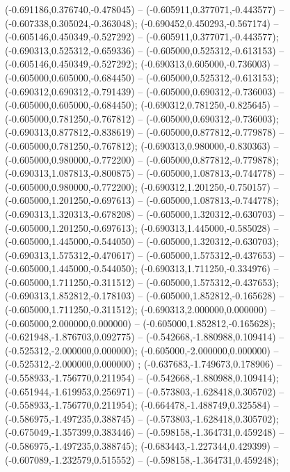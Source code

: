 (-0.691186,0.376740,-0.478045) -- (-0.605911,0.377071,-0.443577) -- (-0.607338,0.305024,-0.363048);
 (-0.690452,0.450293,-0.567174) -- (-0.605146,0.450349,-0.527292) -- (-0.605911,0.377071,-0.443577);
 (-0.690313,0.525312,-0.659336) -- (-0.605000,0.525312,-0.613153) -- (-0.605146,0.450349,-0.527292);
 (-0.690313,0.605000,-0.736003) -- (-0.605000,0.605000,-0.684450) -- (-0.605000,0.525312,-0.613153);
 (-0.690312,0.690312,-0.791439) -- (-0.605000,0.690312,-0.736003) -- (-0.605000,0.605000,-0.684450);
 (-0.690312,0.781250,-0.825645) -- (-0.605000,0.781250,-0.767812) -- (-0.605000,0.690312,-0.736003);
 (-0.690313,0.877812,-0.838619) -- (-0.605000,0.877812,-0.779878) -- (-0.605000,0.781250,-0.767812);
 (-0.690313,0.980000,-0.830363) -- (-0.605000,0.980000,-0.772200) -- (-0.605000,0.877812,-0.779878);
 (-0.690313,1.087813,-0.800875) -- (-0.605000,1.087813,-0.744778) -- (-0.605000,0.980000,-0.772200);
 (-0.690312,1.201250,-0.750157) -- (-0.605000,1.201250,-0.697613) -- (-0.605000,1.087813,-0.744778);
 (-0.690313,1.320313,-0.678208) -- (-0.605000,1.320312,-0.630703) -- (-0.605000,1.201250,-0.697613);
 (-0.690313,1.445000,-0.585028) -- (-0.605000,1.445000,-0.544050) -- (-0.605000,1.320312,-0.630703);
 (-0.690313,1.575312,-0.470617) -- (-0.605000,1.575312,-0.437653) -- (-0.605000,1.445000,-0.544050);
 (-0.690313,1.711250,-0.334976) -- (-0.605000,1.711250,-0.311512) -- (-0.605000,1.575312,-0.437653);
 (-0.690313,1.852812,-0.178103) -- (-0.605000,1.852812,-0.165628) -- (-0.605000,1.711250,-0.311512);
 (-0.690313,2.000000,0.000000) -- (-0.605000,2.000000,0.000000) -- (-0.605000,1.852812,-0.165628);
 (-0.621948,-1.876703,0.092775) -- (-0.542668,-1.880988,0.109414) -- (-0.525312,-2.000000,0.000000);
 (-0.605000,-2.000000,0.000000) -- (-0.525312,-2.000000,0.000000) ;
 (-0.637683,-1.749673,0.178906) -- (-0.558933,-1.756770,0.211954) -- (-0.542668,-1.880988,0.109414);
 (-0.651944,-1.619953,0.256971) -- (-0.573803,-1.628418,0.305702) -- (-0.558933,-1.756770,0.211954);
 (-0.664478,-1.488749,0.325584) -- (-0.586975,-1.497235,0.388745) -- (-0.573803,-1.628418,0.305702);
 (-0.675049,-1.357399,0.383446) -- (-0.598158,-1.364731,0.459248) -- (-0.586975,-1.497235,0.388745);
 (-0.683443,-1.227344,0.429399) -- (-0.607089,-1.232579,0.515552) -- (-0.598158,-1.364731,0.459248);
